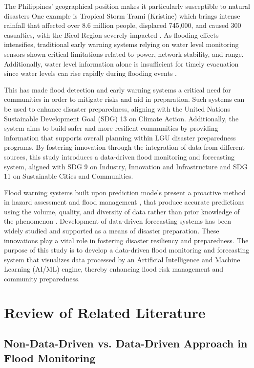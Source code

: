 \documentclass{research}
\begin{document}
The Philippines' geographical position makes it particularly susceptible to natural disasters
\cite{tolentino2022real}
One example is Tropical Storm Trami (Kristine) which 
brings intense rainfall that affected over 8.6 million people, 
displaced 745,000, and caused 300 casualties, with the Bicol Region severely impacted \cite{wfp2024kristine}. 
As flooding effects intensifies, traditional early warning systems relying on water level monitoring sensors shown critical limitations related to power, network stability, and range.
Additionally, water level information alone is insufficient for timely evacuation since water levels can rise rapidly during flooding events \cite{piadeh2022critical}.

This has made flood detection and early warning systems a 
critical need for communities in order to mitigate risks and aid in preparation. 
Such systems can be used to enhance disaster 
preparedness, aligning with the United Nations Sustainable Development Goal (SDG) 13 on 
Climate Action. Additionally, the system aims to build safer and more resilient 
communities by providing information that supports overall planning within LGU disaster 
preparedness programs. By fostering innovation through the integration of data from 
different sources, this study introduces a data-driven flood monitoring and forecasting 
system, aligned with SDG 9 on Industry, Innovation and Infrastructure and SDG 11 on 
Sustainable Cities and Communities.

Flood warning systems built upon prediction models present a proactive method in hazard 
assessment and flood management \cite{hammood2021systematic}, that produce accurate 
predictions using the volume, quality, and diversity of data rather than prior 
knowledge of the phenomenon \cite{guo2022datadriven}. Development of data-driven 
forecasting systems has been widely studied and supported as a means of disaster 
preparation. These innovations play a vital role in fostering disaster resiliency and 
preparedness. The purpose of this study is to develop a data-driven flood monitoring 
and forecasting system that visualizes data processed by an Artificial Intelligence and 
Machine Learning (AI/ML) engine, thereby enhancing flood risk management and community 
preparedness.

\section{Review of Related Literature}

\subsection*{Non-Data-Driven vs. Data-Driven Approach in Flood Monitoring}
\end{document}
